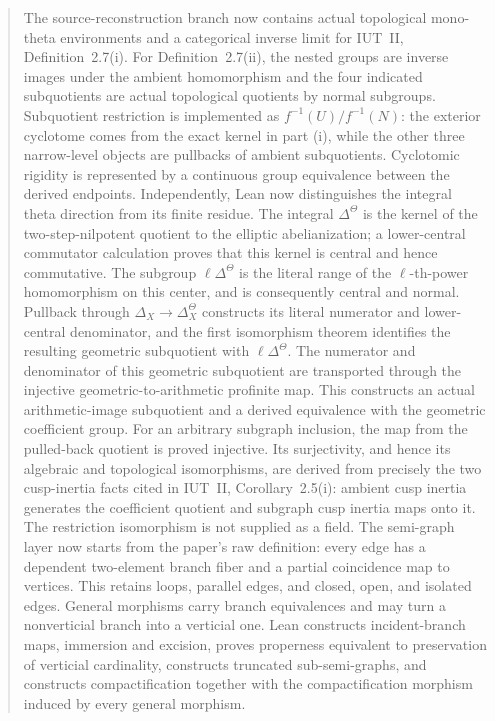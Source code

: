 \documentclass[11pt]{article}
\theoremstyle{plain}
\theoremstyle{definition}
\theoremstyle{remark}
\begin{document}
\begin{abstract}
The source-reconstruction branch now contains actual topological
mono-theta environments and a categorical inverse limit for IUT~II,
Definition~2.7(i).  For Definition~2.7(ii), the nested groups are inverse
images under the ambient homomorphism and the four indicated subquotients are
actual topological quotients by normal subgroups.  Subquotient restriction is
implemented as \(f^{-1}(U)/f^{-1}(N)\): the exterior cyclotome comes from the
exact kernel in part (i), while the other three narrow-level objects are
pullbacks of ambient subquotients.  Cyclotomic rigidity is represented by a
continuous group equivalence between the derived endpoints.  Independently,
Lean now distinguishes the integral theta direction from its finite residue.
The integral \(\Delta^\Theta\) is the kernel of the two-step-nilpotent quotient
to the elliptic abelianization; a lower-central commutator calculation proves
that this kernel is central and hence commutative.  The subgroup
\(\ell\Delta^\Theta\) is the literal range of the \(\ell\)-th-power
homomorphism on this center, and is consequently central and normal.  Pullback through
\(\Delta_X\to\Delta_X^\Theta\) constructs its literal numerator and
lower-central denominator, and the first isomorphism theorem identifies the
resulting geometric subquotient with \(\ell\Delta^\Theta\).  The
numerator and denominator of this geometric subquotient are transported
through the injective geometric-to-arithmetic profinite map.  This constructs
an actual arithmetic-image subquotient and a derived equivalence with the
geometric coefficient group.  For an arbitrary subgraph inclusion, the map
from the pulled-back quotient is proved injective.  Its surjectivity, and hence
its algebraic and topological isomorphisms, are derived from precisely the two
cusp-inertia facts cited in IUT~II, Corollary~2.5(i): ambient cusp inertia
generates the coefficient quotient and subgraph cusp inertia maps onto it.
The restriction isomorphism is not supplied as a field.  The semi-graph layer
now starts from the paper's raw definition: every edge has a dependent
two-element branch fiber and a partial coincidence map to vertices.  This
retains loops, parallel edges, and closed, open, and isolated edges.  General
morphisms carry branch equivalences and may turn a nonverticial branch into a
verticial one.  Lean constructs incident-branch maps, immersion and excision,
proves properness equivalent to preservation of verticial cardinality,
constructs truncated sub-semi-graphs, and constructs compactification together
with the compactification morphism induced by every general morphism.

\end{abstract}
\end{document}

